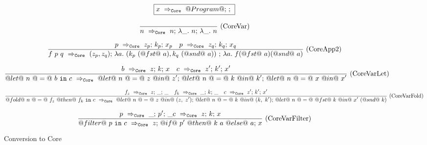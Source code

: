 
\begin{figure*}

\newcommand \acc {\tau_\mathit{acc}}
\newcommand \xtr {\tau_\mathit{extract}}
\newcommand \lam[1] {\lambda{} #1.~}

$$
\boxed{x ~\Rightarrow_{\mathtt{Core}}~ @Program@\mathtt{;}~\mathtt{;}~}
$$


$$
\ruleI
{
}
{ 
    \ToCore{n}{n}{\lam{\_} n}{\lam{\_} n}
}
\textrm{(CoreVar)}
$$

$$
\ruleI
{
    \ToCore{p}{z_p}{k_p}{x_p}
    \quad
    \ToCore{p}{z_q}{k_q}{x_q}
}
{ 
    \ToCore{f~p~q}{(z_p, z_q)}{\lam{a} (k_p~(@fst@~a), k_q~(@snd@~a))~}{\lam{a} f (@fst@~a) (@snd@~a)}
}
\textrm{(CoreApp2)}
$$

$$
\frac {\displaystyle 
    b ~\Rightarrow_{\mathtt{Core}}~ z\mathtt{;}~k\mathtt{;}~x
    \quad
    c ~\Rightarrow_{\mathtt{Core}}~ z'\mathtt{;}~k'\mathtt{;}~x'
} {\displaystyle  
    @let@~n~@=@~b~\mathtt{in}~c ~\Rightarrow_{\mathtt{Core}}~ @let@~n~@=@~z~@in@~z'\mathtt{;}~@let@~n~@=@~k~@in@~k'\mathtt{;}~@let@~n~@=@~x~@in@~x'
} \ 
\textrm{(CoreVarLet)}
$$

$$
\frac {\displaystyle 
    f_z ~\Rightarrow_{\mathtt{Core}}~ z\mathtt{;}~\_\mathtt{;}~\_
    \quad
    f_k ~\Rightarrow_{\mathtt{Core}}~ \_\mathtt{;}~k\mathtt{;}~\_
    \quad
    c ~\Rightarrow_{\mathtt{Core}}~ z'\mathtt{;}~k'\mathtt{;}~x'
} {\displaystyle  
    @fold@~n~@=@~f_z~@then@~f_k~\mathtt{in}~c ~\Rightarrow_{\mathtt{Core}}~ @let@~n~@=@~z~@in@~(z,~z')\mathtt{;}~@let@~n~@=@~k~@in@~(k,~k')\mathtt{;}~@let@~n~@=@~@fst@~k~@in@~x'~(@snd@~k)
} \ 
\textrm{(CoreVarFold)}
$$

$$
\frac {\displaystyle 
    p ~\Rightarrow_{\mathtt{Core}}~ \_\mathtt{;}~p'\mathtt{;}~\_
    c ~\Rightarrow_{\mathtt{Core}}~ z\mathtt{;}~k\mathtt{;}~x
} {\displaystyle  
    @filter@~p~\mathtt{in}~c ~\Rightarrow_{\mathtt{Core}}~ z\mathtt{;}~@if@~p'~@then@~k~a~@else@~a\mathtt{;}~x
} \ 
\textrm{(CoreVarFilter)}
$$



\caption{Conversion to Core}
\label{fig:core:compile}
\end{figure*}


